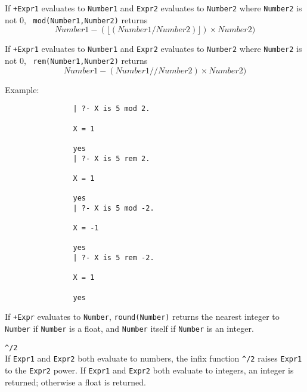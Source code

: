 \begin{description}
%
If {\tt +Expr1} evaluates to {\tt Number1} and {\tt Expr2} evaluates
to {\tt Number2} where {\tt Number2} is not 0, {\tt
mod(Number1,Number2)} returns
\[
	Number1 - (\lfloor (Number1 / Number2) \rfloor) \times Number2)
\]

%
If {\tt +Expr1} evaluates to {\tt Number1} and {\tt Expr2} evaluates
to {\tt Number2} where {\tt Number2} is not 0, {\tt
rem(Number1,Number2)} returns
\[
	Number1 - ({Number1} // {Number2}) \times Number2)
\]

    Example:
    {\footnotesize
     \begin{verbatim}
                | ?- X is 5 mod 2.

                X = 1

                yes
                | ?- X is 5 rem 2.

                X = 1

                yes
                | ?- X is 5 mod -2.

                X = -1

                yes
                | ?- X is 5 rem -2.

                X = 1

                yes
  \end{verbatim}}

%
If {\tt +Expr} evaluates to {\tt Number}, {\tt round(Number)} returns
the nearest integer to {\tt Number} if {\tt Number} is a float, and
{\tt Number} itself if {\tt Number} is an integer.


\item \verb|^/2|    \\
%
If {\tt Expr1} and {\tt Expr2} both evaluate to numbers, the infix
function \verb|^/2| raises {\tt Expr1} to the {\tt Expr2} power.  If
{\tt Expr1} and {\tt Expr2} both evaluate to integers, an integer is
returned; otherwise a float is returned.


\end{description}
